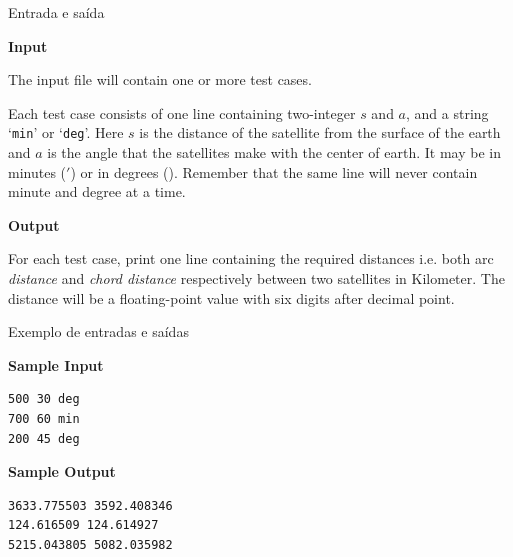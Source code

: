 \begin{frame}[fragile]{Entrada e saída}

\textbf{Input}

The input file will contain one or more test cases.

Each test case consists of one line containing two-integer $s$
and $a$, and a string ‘\texttt{min}’ or ‘\texttt{deg}’. Here $s$ is the distance of the
satellite from the surface of the earth and $a$ is the angle that the
satellites make with the center of earth. It may be in minutes ($'$) or in degrees (\textdegree). Remember that the
same line will never contain minute and degree at a time.

\textbf{Output}

For each test case, print one line containing the required distances i.e. both arc \textit{distance}
 and \textit{chord distance} respectively between two satellites in Kilometer. The distance will be a floating-point value
with six digits after decimal point.

\end{frame}

\begin{frame}[fragile]{Exemplo de entradas e saídas}

\begin{minipage}[t]{0.5\textwidth}
\textbf{Sample Input}
\begin{verbatim}
500 30 deg
700 60 min
200 45 deg
\end{verbatim}
\end{minipage}
\begin{minipage}[t]{0.45\textwidth}
\textbf{Sample Output}
\begin{verbatim}
3633.775503 3592.408346
124.616509 124.614927
5215.043805 5082.035982
\end{verbatim}
\end{minipage}
\end{frame}

